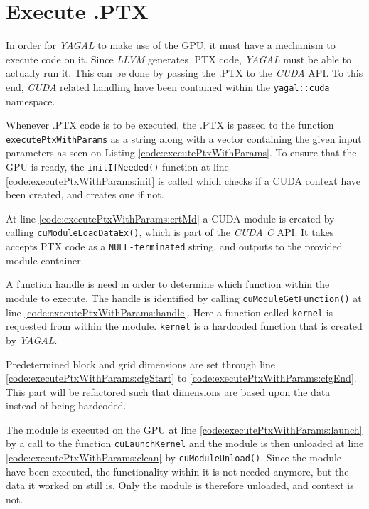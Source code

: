 \section{Execute .PTX}

In order for \textit{YAGAL} to make use of the GPU, it must have a mechanism to execute code on it. Since \textit{LLVM} generates .PTX code, \textit{YAGAL} must be able to actually run it. This can be done by passing the .PTX to the \textit{CUDA} API. To this end, \textit{CUDA} related handling have been contained within the \texttt{yagal::cuda} namespace.

Whenever .PTX code is to be executed, the .PTX is passed to the function \texttt{executePtxWithParams} as a string along with a vector containing the given input parameters as seen on Listing \ref{code:executePtxWithParams}. To ensure that the GPU is ready, the \texttt{initIfNeeded()} function at line \ref{code:executePtxWithParams:init} is called which checks if a CUDA context have been created, and creates one if not.

At line \ref{code:executePtxWithParams:crtMd} a CUDA module is created by calling \texttt{cuModuleLoadDataEx()}, which is part of the \textit{CUDA C} API. It takes accepts PTX code as a \texttt{NULL-terminated} string, and outputs to the provided module container.

A function handle is need in order to determine which function within the module to execute. The handle is identified by calling \texttt{cuModuleGetFunction()} at line \ref{code:executePtxWithParams:handle}. Here a function called \texttt{kernel} is requested from within the module. \texttt{kernel} is a hardcoded function that is created by \textit{YAGAL}.

Predetermined block and grid dimensions are set through line \ref{code:executePtxWithParams:cfgStart} to \ref{code:executePtxWithParams:cfgEnd}. This part will be refactored such that dimensions are based upon the data instead of being hardcoded.

The module is executed on the GPU at line \ref{code:executePtxWithParams:launch} by a call to the function \texttt{cuLaunchKernel} and the module is then unloaded at line \ref{code:executePtxWithParams:clean} by \texttt{cuModuleUnload()}. Since the module have been executed, the functionality within it is not needed anymore, but the data it worked on still is. Only the module is therefore unloaded, and context is not.

